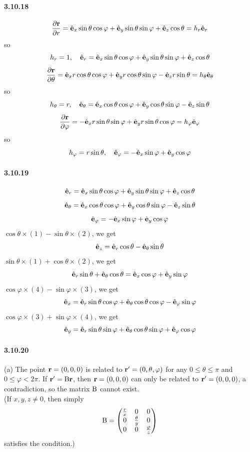 \documentclass[a4paper]{article}
\begin{document}
\paragraph{3.10.18}
\[
\frac{\partial\mathbf{r}}{\partial r}=\hat{\mathbf{e}}_x\sin\theta\cos\varphi+\hat{\mathbf{e}}_y\sin\theta\sin\varphi+\hat{\mathbf{e}}_z\cos\theta=h_r\hat{\mathbf{e}}_r\]
so
\[h_r=1,\quad \hat{\mathbf{e}}_r=\hat{\mathbf{e}}_x\sin\theta\cos\varphi+\hat{\mathbf{e}}_y\sin\theta\sin\varphi+\hat{\mathbf{e}}_z\cos\theta
\]
\[
\frac{\partial\mathbf{r}}{\partial\theta}=\hat{\mathbf{e}}_xr\cos\theta\cos\varphi+\hat{\mathbf{e}}_y r\cos\theta\sin\varphi-\hat{\mathbf{e}}_z r\sin\theta=h_\theta\hat{\mathbf{e}}_\theta\]
so
\[h_\theta=r,\quad \hat{\mathbf{e}}_\theta=\hat{\mathbf{e}}_x\cos\theta\cos\varphi+\hat{\mathbf{e}}_y\cos\theta\sin\varphi-\hat{\mathbf{e}}_z\sin\theta
\]
\[
\frac{\partial\mathbf{r}}{\partial\varphi}=-\hat{\mathbf{e}}_x r\sin\theta\sin\varphi+\hat{\mathbf{e}}_y r\sin\theta\cos\varphi=h_\varphi\hat{\mathbf{e}}_\varphi
\]
so
\[
h_\varphi=r\sin\theta,\quad\hat{\mathbf{e}}_\varphi=-\hat{\mathbf{e}}_x\sin\varphi+\hat{\mathbf{e}}_y\cos\varphi
\]

\paragraph{3.10.19}
\begin{equation}
    \hat{\mathbf{e}}_r=\hat{\mathbf{e}}_x\sin\theta\cos\varphi+\hat{\mathbf{e}}_y\sin\theta\sin\varphi+\hat{\mathbf{e}}_z\cos\theta
\end{equation}
\begin{equation}
    \hat{\mathbf{e}}_\theta=\hat{\mathbf{e}}_x\cos\theta\cos\varphi+\hat{\mathbf{e}}_y\cos\theta\sin\varphi-\hat{\mathbf{e}}_z\sin\theta
\end{equation}
\begin{equation}
    \hat{\mathbf{e}}_\varphi=-\hat{\mathbf{e}}_x\sin\varphi+\hat{\mathbf{e}}_y\cos\varphi
\end{equation}
$\cos\theta\times(1)-\sin\theta\times(2)$, we get 
\[
\hat{\mathbf{e}}_z=\hat{\mathbf{e}}_r\cos\theta-\hat{\mathbf{e}}_\theta\sin\theta
\]
$\sin\theta\times(1)+\cos\theta\times(2)$, we get 
\begin{equation}
    \hat{\mathbf{e}}_r\sin\theta+\hat{\mathbf{e}}_\theta\cos\theta=\hat{\mathbf{e}}_x\cos\varphi+\hat{\mathbf{e}}_y\sin\varphi
\end{equation}
$\cos\varphi\times(4)-\sin\varphi\times(3)$, we get
\[
\hat{\mathbf{e}}_x=\hat{\mathbf{e}}_r\sin\theta\cos\varphi+\hat{\mathbf{e}}_\theta\cos\theta\cos\varphi-\hat{\mathbf{e}}_\varphi\sin\varphi
\]
$\cos\varphi\times(3)+\sin\varphi\times(4)$, we get
\[
\hat{\mathbf{e}}_y=\hat{\mathbf{e}}_r\sin\theta\sin\varphi+\hat{\mathbf{e}}_\theta\cos\theta\sin\varphi+\hat{\mathbf{e}}_\varphi\cos\varphi
\]

\paragraph{3.10.20}
(a) The point $\mathbf{r}=(0,0,0)$ is related to $\mathbf{r'}=(0,\theta,\varphi)$ for any $0\leq\theta\leq\pi$ and $0\leq\varphi<2\pi$. If $\mathbf{r'}=\mathrm{B}\mathbf{r}$, then $\mathbf{r}=(0,0,0)$ can only be related to $\mathbf{r'}=(0,0,0)$, a contradiction, so the matrix $\mathrm{B}$ cannot exist.\\
(If $x,y,z\neq0$, then simply 
\[\mathrm{B}=
\begin{pmatrix}
\frac{r}{x}&0&0\\
0&\frac{\theta}{y}&0\\
0&0&\frac{\varphi}{z}
\end{pmatrix}
\]
satisfies the condition.)
\end{document}
